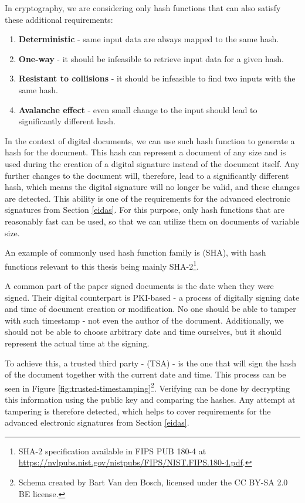 \documentclass[thesismargins, english, thesislinespacing, onelinechapterstyle, upjsfrontpage]{rnthesis}
\begin{document}
In cryptography, we are considering only hash functions that can also satisfy these additional requirements:

\begin{enumerate}
  \item \textbf{Deterministic} - same input data are always mapped to the same hash.
  \item \textbf{One-way} - it should be infeasible to retrieve input data for a given hash.
  \item \textbf{Resistant to collisions} - it should be infeasible to find two inputs with the same hash.
  \item \textbf{Avalanche effect} - even small change to the input should lead to significantly different hash.
\end{enumerate}

In the context of digital documents, we can use such hash function to generate a hash for the document.
This hash can represent a document of any size and is used during the creation of a digital signature instead of the document itself.
Any further changes to the document will, therefore, lead to a significantly different hash, which means the digital signature will no longer be valid, and these changes are detected.
This ability is one of the requirements for the advanced electronic signatures from Section \ref{eidas}.
For this purpose, only hash functions that are reasonably fast can be used, so that we can utilize them on documents of variable size.

\iffalse %
TODO: Add scheme of document > hash - valid signature, change in document > different hash - invalid signature.
\fi

An example of commonly used hash function family is  (SHA), with hash functions relevant to this thesis being mainly SHA-2\footnote{SHA-2 specification available in FIPS PUB 180-4 at \url{https://nvlpubs.nist.gov/nistpubs/FIPS/NIST.FIPS.180-4.pdf}.}.

A common part of the paper signed documents is the date when they were signed.
Their digital counterpart is PKI-based  - a process of digitally signing date and time of document creation or modification.
No one should be able to tamper with such timestamp - not even the author of the document.
Additionally, we should not be able to choose arbitrary date and time ourselves, but it should represent the actual time at the signing.

To achieve this, a trusted third party -  (TSA) - is the one that will sign the hash of the document together with the current date and time.
This process can be seen in Figure \ref{fig:trusted-timestamping}\footnote{Schema created by Bart Van den Bosch, licensed under the CC BY-SA 2.0 BE license.}.
Verifying can be done by decrypting this information using the public key and comparing the hashes.
Any attempt at tampering is therefore detected, which helps to cover requirements for the advanced electronic signatures from Section \ref{eidas}.
\end{document}
